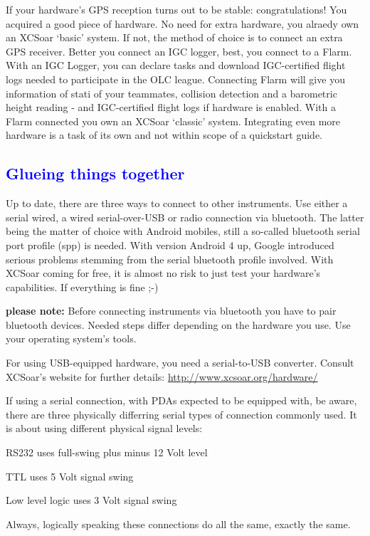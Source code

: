 \documentclass[english,a4paper,12pt,utf8]{scrreprt}
\begin{document}
If your hardware's GPS reception turns out to be stable: congratulations! You 
acquired a good piece of hardware. No need for extra hardware, you alraedy own 
an XCSoar `basic' system. If not, the method of choice is to connect an extra 
GPS receiver. Better you connect an IGC logger, best, you connect to a Flarm. 
With an IGC Logger, you can declare tasks and download IGC-certified flight 
logs needed to participate in the OLC league.
Connecting Flarm will give you information of stati of your teammates, 
collision detection and a barometric height reading - and IGC-certified flight 
logs if hardware is enabled.
With a Flarm connected you own an XCSoar `classic' system.  Integrating even 
more hardware is a task of its own and not within scope of a quickstart guide. 

\subsection*{\textcolor{blue}{Glueing things together}}
Up to date, there are three ways to connect to other instruments.  Use either 
a serial wired, a wired serial-over-USB or radio connection via bluetooth. The 
latter being the matter of choice with Android mobiles, still a so-called 
bluetooth serial port profile (spp) is needed. With version Android 4 up, 
Google introduced serious problems stemming from the serial bluetooth profile 
involved. With XCSoar coming for free, it is almost no risk to just test your 
hardware's capabilities. If everything is fine ;-)

\textbf{please note:} Before connecting instruments via bluetooth you have to 
pair bluetooth devices. Needed steps differ depending on the hardware you use. 
Use your operating system's tools.

For using USB-equipped hardware, you need a serial-to-USB converter. Consult 
XCSoar's website for further details: {\url{http://www.xcsoar.org/hardware/}}

If using a serial connection, with PDAs expected to be equipped with, be 
aware, there are three physically differring serial types of connection 
commonly used. It is about using different physical signal levels:

\begin{compactitem}
\item RS232 uses full-swing plus minus 12 Volt level
\item TTL uses 5 Volt signal swing
\item Low level logic uses 3 Volt signal swing
\end{compactitem}
Always, logically speaking these connections do all the same, exactly the 
same.
\end{document}

